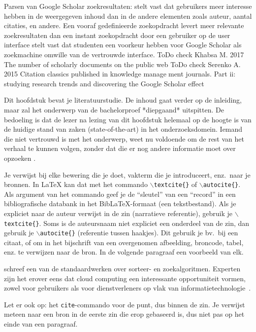 Parsen van Google Scholar zoekresultaten:
\autocite{Kim2019} stelt vast dat gebruikers meer interesse hebben in de weergegeven inhoud dan in de andere elementen zoals auteur, aantal citaties, en andere.
Een vooraf gedefinieerde zoekopdracht levert meer relevante zoekresultaten dan een instant zoekopdracht door een gebruiker op de user interface \autocite{Zhang2013}
\textcite{Wu2014} stelt vast dat studenten een voorkeur hebben voor Google Scholar als zoekmachine omwille van de vertrouwde interface.
ToDo check Khabsa M. 2017 The number of scholarly documents on the public web
ToDo check Serenko A. 2015 Citation classics published in knowledge management journals. Part ii: studying research trends and discovering the Google Scholar effect

Dit hoofdstuk bevat je literatuurstudie. De inhoud gaat verder op de inleiding, maar zal het onderwerp van de bachelorproef *diepgaand* uitspitten. De bedoeling is dat de lezer na lezing van dit hoofdstuk helemaal op de hoogte is van de huidige stand van zaken (state-of-the-art) in het onderzoeksdomein. Iemand die niet vertrouwd is met het onderwerp, weet nu voldoende om de rest van het verhaal te kunnen volgen, zonder dat die er nog andere informatie moet over opzoeken \autocite{Pollefliet2011}.

Je verwijst bij elke bewering die je doet, vakterm die je introduceert, enz.\ naar je bronnen. In \LaTeX{} kan dat met het commando \texttt{$\backslash${textcite\{\}}} of \texttt{$\backslash${autocite\{\}}}. Als argument van het commando geef je de ``sleutel'' van een ``record'' in een bibliografische databank in het Bib\LaTeX{}-formaat (een tekstbestand). Als je expliciet naar de auteur verwijst in de zin (narratieve referentie), gebruik je \texttt{$\backslash${}textcite\{\}}. Soms is de auteursnaam niet expliciet een onderdeel van de zin, dan gebruik je \texttt{$\backslash${}autocite\{\}} (referentie tussen haakjes). Dit gebruik je bv.~bij een citaat, of om in het bijschrift van een overgenomen afbeelding, broncode, tabel, enz. te verwijzen naar de bron. In de volgende paragraaf een voorbeeld van elk.

\textcite{Knuth1998} schreef een van de standaardwerken over sorteer- en zoekalgoritmen. Experten zijn het erover eens dat cloud computing een interessante opportuniteit vormen, zowel voor gebruikers als voor dienstverleners op vlak van informatietechnologie~\autocite{Creeger2009}.

Let er ook op: het \texttt{cite}-commando voor de punt, dus binnen de zin. Je verwijst meteen naar een bron in de eerste zin die erop gebaseerd is, dus niet pas op het einde van een paragraaf.

